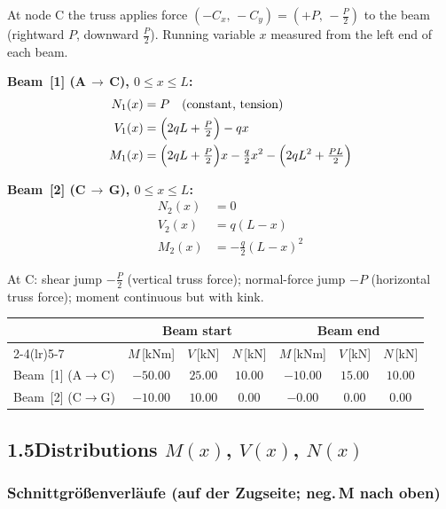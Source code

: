 \documentclass[a4paper,11pt]{article}
\begin{document}
At node C the truss applies force $(-C_x,\,-C_y) = (+P,\,-\tfrac{P}{2})$
to the beam (rightward $P$, downward $\tfrac{P}{2}$).
Running variable $x$ measured from the left end of each beam.

\textbf{Beam~[1] (A\,$\to$\,C), $0 \le x \le L$:}
\begin{align*}
  N_1(x) &= P \quad\text{(constant, tension)} \\
  V_1(x) &= \Bigl(2qL + \tfrac{P}{2}\Bigr) - qx \\
  M_1(x) &= \Bigl(2qL + \tfrac{P}{2}\Bigr)x - \tfrac{q}{2}x^2
            - \Bigl(2qL^2 + \tfrac{PL}{2}\Bigr)
\end{align*}

\textbf{Beam~[2] (C\,$\to$\,G), $0 \le x \le L$:}
\begin{align*}
  N_2(x) &= 0 \\
  V_2(x) &= q(L - x) \\
  M_2(x) &= -\tfrac{q}{2}(L - x)^2
\end{align*}

At C: shear jump $-\tfrac{P}{2}$ (vertical truss force);
normal-force jump $-P$ (horizontal truss force); moment continuous but with kink.

\medskip
\begin{center}
\begin{tabular}{l cccccc}
\toprule
 & \multicolumn{3}{c}{\textbf{Beam start}} & \multicolumn{3}{c}{\textbf{Beam end}} \\
\cmidrule(lr){2-4}\cmidrule(lr){5-7}
 & $M$\,[kNm] & $V$\,[kN] & $N$\,[kN]
 & $M$\,[kNm] & $V$\,[kN] & $N$\,[kN] \\
\midrule
Beam~[1] (A$\to$C) & $-50.00$ & $25.00$ & $10.00$ & $-10.00$ & $15.00$ & $10.00$ \\[3pt]
Beam~[2] (C$\to$G) & $-10.00$ & $10.00$ & $0.00$ & $-0.00$ & $0.00$ & $0.00$ \\
\bottomrule
\end{tabular}
\end{center}

\subsection*{1.5\quad Distributions $M(x)$, $V(x)$, $N(x)$}


\subsubsection*{Schnittgrößenverläufe (auf der Zugseite; neg.\,M nach oben)}
\end{document}
